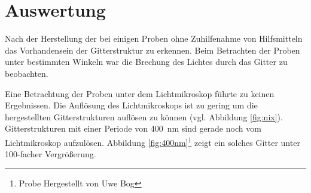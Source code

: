 \chapter{Auswertung}

Nach der Herstellung der bei einigen Proben ohne Zuhilfenahme von Hilfsmitteln das Vorhandensein der Gitterstruktur zu erkennen. Beim Betrachten der Proben unter bestimmten Winkeln war die Brechung des Lichtes durch das Gitter zu beobachten.

Eine Betrachtung der Proben unter dem Lichtmikroskop führte zu keinen Ergebnissen. Die Auflösung des Lichtmikroskops ist zu gering um die hergestellten Gitterstrukturen auflösen zu können (vgl. Abbildung \ref{fig:nix}). Gitterstrukturen mit einer Periode von 400~nm sind gerade noch vom Lichtmikroskop aufzulösen. Abbildung \ref{fig:400nm}\footnote[1]{Probe Hergestellt von Uwe Bog} zeigt ein solches Gitter unter 100-facher Vergrößerung.

